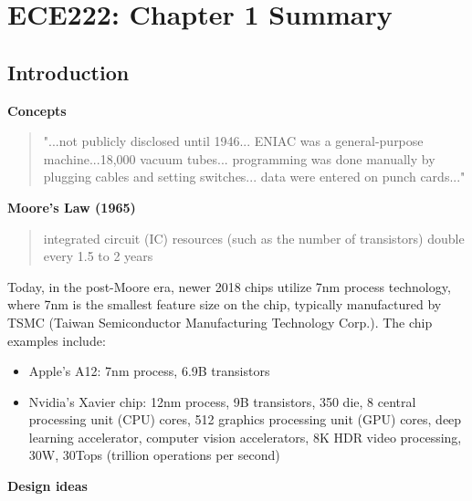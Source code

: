 \newpage

\section*{ECE222: Chapter 1 Summary}

\subsection*{Introduction}

\textbf{Concepts}

\begin{quote}
"...not publicly disclosed until 1946... ENIAC was a general-purpose machine...18,000 vacuum tubes... programming was done manually by plugging cables and setting switches... data were entered on punch cards..."
\end{quote}

\textbf{Moore's Law (1965)}

\begin{quote}

integrated circuit (IC) resources (such as the number of transistors) double every 1.5 to 2 years
\end{quote}
Today, in the post-Moore era, newer 2018 chips utilize 7nm process technology, where 7nm is the smallest feature size on the chip, typically manufactured by TSMC (Taiwan Semiconductor Manufacturing Technology Corp.). The chip examples include:

\begin{itemize}
\item Apple's A12: 7nm process, 6.9B transistors
\item Nvidia's Xavier chip: 12nm process, 9B transistors, 350 die, 8 central processing unit (CPU) cores, 512 graphics processing unit (GPU) cores, deep learning accelerator, computer vision accelerators, 8K HDR video processing, 30W, 30Tops (trillion operations per second)
\end{itemize}

\textbf{Design ideas}

